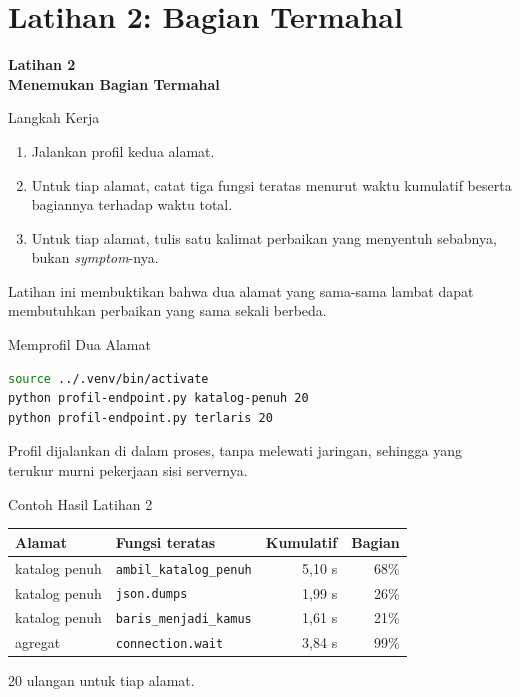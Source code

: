 \documentclass[aspectratio=169, table, 12pt]{beamer}
\begin{document}
\section{Latihan 2: Bagian Termahal}

\begin{frame}{\hfill}
  \centering
  \Huge{\textbf{Latihan 2\\Menemukan Bagian Termahal}}
\end{frame}

\begin{frame}{{\Large Langkah Kerja}}
  \vspace{8pt}
  \begin{enumerate}
    \item Jalankan profil kedua alamat.
    \item Untuk tiap alamat, catat tiga fungsi teratas menurut waktu
          kumulatif beserta bagiannya terhadap waktu total.
    \item Untuk tiap alamat, tulis satu kalimat perbaikan yang menyentuh
          sebabnya, bukan \textit{symptom}-nya.
  \end{enumerate}
  \vspace{8pt}
  {\footnotesize Latihan ini membuktikan bahwa dua alamat yang sama-sama
  lambat dapat membutuhkan perbaikan yang sama sekali berbeda.}
\end{frame}

\begin{frame}[fragile]{{\Large Memprofil Dua Alamat}}
  \vspace{2pt}
\begin{lstlisting}[language=bash]
source ../.venv/bin/activate
python profil-endpoint.py katalog-penuh 20
python profil-endpoint.py terlaris 20
\end{lstlisting}
  \vspace{6pt}
  {\footnotesize Profil dijalankan di dalam proses, tanpa melewati jaringan,
  sehingga yang terukur murni pekerjaan sisi servernya.}
\end{frame}

\begin{frame}{{\Large Contoh Hasil Latihan 2}}
  \vspace{4pt}
  \centering
  {\footnotesize
  \begin{tabularx}{\textwidth}{lYrr}
    \hline
    \textbf{Alamat} & \textbf{Fungsi teratas} & \textbf{Kumulatif} & \textbf{Bagian} \\
    \hline
    katalog penuh & \texttt{ambil\_katalog\_penuh} & 5,10 s & 68\% \\
    \hline
    katalog penuh & \texttt{json.dumps} & 1,99 s & 26\% \\
    \hline
    katalog penuh & \texttt{baris\_menjadi\_kamus} & 1,61 s & 21\% \\
    \hline
    agregat & \texttt{connection.wait} & 3,84 s & 99\% \\
    \hline
  \end{tabularx}}

  \vspace{6pt}
  {\footnotesize 20 ulangan untuk tiap alamat.}
\end{frame}
\end{document}
